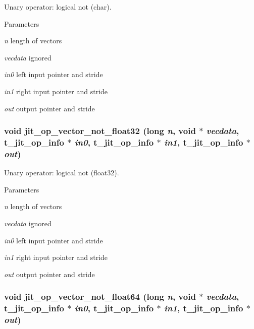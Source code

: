 Unary operator: logical not (char). 
\begin{DoxyParams}{Parameters}
\item[{\em n}]length of vectors \item[{\em vecdata}]ignored \item[{\em in0}]left input pointer and stride \item[{\em in1}]right input pointer and stride \item[{\em out}]output pointer and stride \end{DoxyParams}
\hypertarget{group__opvecmod_ga92ff286eb573295576e46b3155100e3c}{
\subsubsection[{jit\_\-op\_\-vector\_\-not\_\-float32}]{\setlength{\rightskip}{0pt plus 5cm}void jit\_\-op\_\-vector\_\-not\_\-float32 (long {\em n}, \/  void $\ast$ {\em vecdata}, \/  {\bf t\_\-jit\_\-op\_\-info} $\ast$ {\em in0}, \/  {\bf t\_\-jit\_\-op\_\-info} $\ast$ {\em in1}, \/  {\bf t\_\-jit\_\-op\_\-info} $\ast$ {\em out})}}
\label{group__opvecmod_ga92ff286eb573295576e46b3155100e3c}


Unary operator: logical not (float32). 
\begin{DoxyParams}{Parameters}
\item[{\em n}]length of vectors \item[{\em vecdata}]ignored \item[{\em in0}]left input pointer and stride \item[{\em in1}]right input pointer and stride \item[{\em out}]output pointer and stride \end{DoxyParams}
\hypertarget{group__opvecmod_ga537bd927f9580bad702b6f41f5681014}{
\subsubsection[{jit\_\-op\_\-vector\_\-not\_\-float64}]{\setlength{\rightskip}{0pt plus 5cm}void jit\_\-op\_\-vector\_\-not\_\-float64 (long {\em n}, \/  void $\ast$ {\em vecdata}, \/  {\bf t\_\-jit\_\-op\_\-info} $\ast$ {\em in0}, \/  {\bf t\_\-jit\_\-op\_\-info} $\ast$ {\em in1}, \/  {\bf t\_\-jit\_\-op\_\-info} $\ast$ {\em out})}}
\label{group__opvecmod_ga537bd927f9580bad702b6f41f5681014}


